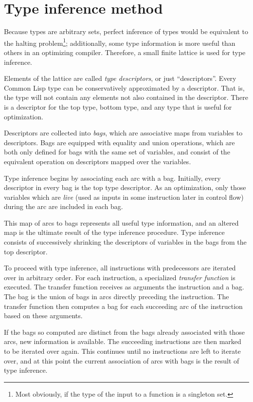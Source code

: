 \section{Type inference method}

Because \commonlisp{} types are arbitrary sets, perfect inference of \commonlisp{} types would be equivalent to the halting problem\footnote{Most obviously, if the type of the input to a function is a singleton set.}; additionally, some type information is more useful than others in an optimizing compiler. Therefore, a small finite lattice is used for type inference.

Elements of the lattice are called \textit{type descriptors}, or just ``descriptors''. Every Common Lisp type can be conservatively approximated by a descriptor. That is, the type will not contain any elements not also contained in the descriptor. There is a descriptor for the top type, bottom type, and any type that is useful for optimization.

Descriptors are collected into \textit{bags}, which are associative maps from variables to descriptors. Bags are equipped with equality and union operations, which are both only defined for bags with the same set of variables, and consist of the equivalent operation on descriptors mapped over the variables.

Type inference begins by associating each arc with a bag. Initially, every descriptor in every bag is the top type descriptor. As an optimization, only those variables which are \textit{live} (used as inputs in some instruction later in control flow) during the arc are included in each bag.

This map of arcs to bags represents all useful type information, and an altered map is the ultimate result of the type inference procedure. Type inference consists of successively shrinking the descriptors of variables in the bags from the top descriptor.

To proceed with type inference, all instructions with predecessors are iterated over in arbitrary order. For each instruction, a specialized \textit{transfer function} is executed. The transfer function receives as arguments the instruction and a bag. The bag is the union of bags in arcs directly preceding the instruction. The transfer function then computes a bag for each succeeding arc of the instruction based on these arguments.

If the bags so computed are distinct from the bags already associated with those arcs, new information is available. The succeeding instructions are then marked to be iterated over again. This continues until no instructions are left to iterate over, and at this point the current association of arcs with bags is the result of type inference.

